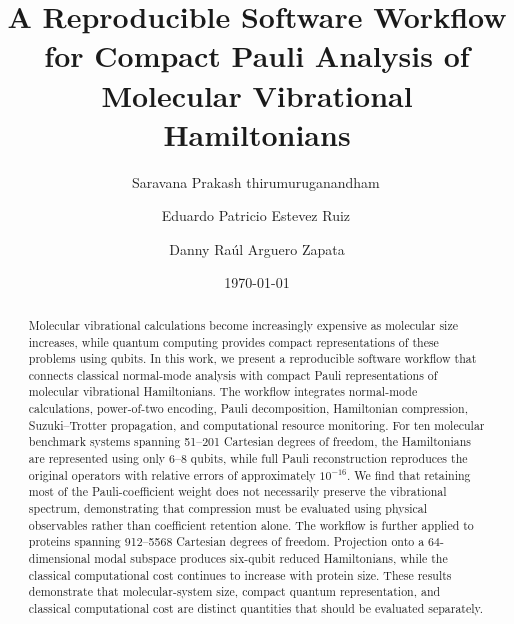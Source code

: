 \documentclass[aip,jcp,reprint,amsmath,amssymb,floatfix]{revtex4-2}
\begin{document}
\title{A Reproducible Software Workflow for Compact Pauli Analysis of Molecular Vibrational Hamiltonians}
\newcommand{\orcidauthorA}{0000-0001-9032-2705} %
\newcommand{\orcidauthorB}{0000-0003-1753-4204} %

\author{
Saravana Prakash thirumuruganandham\,}
\author{
Eduardo Patricio Estevez Ruiz\,}
\author{
Danny Raúl Arguero Zapata}

\date{\today}

\begin{abstract}
Molecular vibrational calculations become increasingly expensive as molecular size increases, while quantum computing provides compact representations of these problems using qubits. In this work, we present a reproducible software workflow that connects classical normal-mode analysis with compact Pauli representations of molecular vibrational Hamiltonians. The workflow integrates normal-mode calculations, power-of-two encoding, Pauli decomposition, Hamiltonian compression, Suzuki--Trotter propagation, and computational resource monitoring. For ten molecular benchmark systems spanning 51--201 Cartesian degrees of freedom, the Hamiltonians are represented using only 6--8 qubits, while full Pauli reconstruction reproduces the original operators with relative errors of approximately $10^{-16}$. We find that retaining most of the Pauli-coefficient weight does not necessarily preserve the vibrational spectrum, demonstrating that compression must be evaluated using physical observables rather than coefficient retention alone. The workflow is further applied to proteins spanning 912--5568 Cartesian degrees of freedom. Projection onto a 64-dimensional modal subspace produces six-qubit reduced Hamiltonians, while the classical computational cost continues to increase with protein size. These results demonstrate that molecular-system size, compact quantum representation, and classical computational cost are distinct quantities that should be evaluated separately.

\end{abstract}
\vspace{0.8em}
\maketitle
\end{document}
